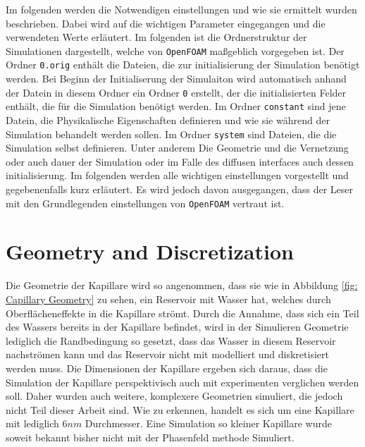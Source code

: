 Im folgenden werden die Notwendigen einstellungen und wie sie ermittelt wurden beschrieben. Dabei wird auf die wichtigen Parameter eingegangen und die verwendeten Werte erläutert. Im folgenden ist die Ordnerstruktur der Simulationen dargestellt, welche von \texttt{OpenFOAM} maßgeblich vorgegeben ist. Der Ordner \texttt{0.orig} enthält die Dateien, die zur initialisierung der Simulation benötigt werden. Bei Beginn der Initialiserung der Simulaiton wird automatisch anhand der Datein in diesem Ordner ein Ordner \texttt{0} erstellt, der die initialisierten Felder enthält, die für die Simulation benötigt werden. Im Ordner \texttt{constant} sind jene Datein, die Physikalische Eigenschaften definieren und wie sie während der Simulation behandelt werden sollen. Im Ordner \texttt{system} sind Dateien, die die Simulation selbst definieren. Unter anderem Die Geometrie und die Vernetzung oder auch dauer der Simulation oder im Falle des diffusen interfaces auch dessen initialisierung. 
Im folgenden werden alle wichtigen einstellungen vorgestellt und gegebenenfalls kurz erläutert. Es wird jedoch davon ausgegangen, dass der Leser mit den Grundlegenden einstellungen von \texttt{OpenFOAM} vertraut ist.

\section{Geometry and Discretization}
Die Geometrie der Kapillare wird so angenommen, dass sie wie in Abbildung \ref{fig: Capillary Geometry} zu sehen, ein Reservoir mit Wasser hat, welches durch Oberflächeneffekte in die Kapillare strömt. Durch die Annahme, dass sich ein Teil des Wassers bereits in der Kapillare befindet, wird in der Simulieren Geometrie lediglich die Randbedingung so gesetzt, dass das Wasser in diesem Reservoir nachströmen kann und das Reservoir nicht mit modelliert und diskretisiert werden muss. Die Dimensionen der Kapillare ergeben sich daraus, dass die Simulation der Kapillare perspektivisch auch mit experimenten verglichen werden soll. Daher wurden auch weitere, komplexere Geometrien simuliert, die jedoch nicht Teil dieser Arbeit sind. 
Wie zu erkennen, handelt es sich um eine Kapillare mit lediglich $6nm$ Durchmesser. Eine Simulation so kleiner Kapillare wurde soweit bekannt bisher nicht mit der Phasenfeld methode Simuliert.



